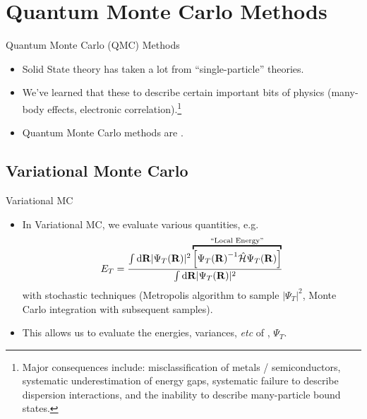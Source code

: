 \documentclass[12pt, pdf, hyperref={draft}, usenames, dvipsnames]{beamer}
\newcommand{\dd}{\mathrm{d}}
\newcommand{\red}[1]{{\bf\color{LancsRed}{#1}}}
\newcommand{\blue}[1]{{\bf\color{NavyBlue}{#1}}}
\newcommand{\green}[1]{{\bf\color{ForestGreen}{#1}}}
\begin{document}


\section{Quantum Monte Carlo Methods}

\begin{frame}{Quantum Monte Carlo (QMC) Methods}
\begin{itemize}
\item Solid State theory has taken a lot from ``single-particle''
theories.

\item We've learned that these \red{fail} to describe certain important bits
of physics (many-body effects, electronic correlation).\footnote{Major
consequences include: misclassification of metals / semiconductors, systematic
underestimation of energy gaps, systematic failure to describe dispersion
interactions, and the inability to describe many-particle bound states.}

\item Quantum Monte Carlo methods are \blue{strikingly different}.
\end{itemize}
\end{frame}

\subsection{Variational Monte Carlo}

\begin{frame}{Variational MC}
\begin{itemize}
  \item In Variational MC, we evaluate various quantities, e.g.
  \begin{equation}
    E_T = \dfrac{\int\dd{\bf R} \lvert \Psi_T({\bf R})\rvert^2
    \overbracket{\left[{\Psi_T({\bf R})}^{-1} \mathcal{\hat H} \Psi_T({\bf R})
    \right]}^{\text{``Local Energy''}}}
    {\int\dd{\bf R} \lvert \Psi_T({\bf R})\rvert^2}
  \end{equation}
  with stochastic techniques (Metropolis algorithm to sample $\lvert \Psi_T
  \rvert^2$, Monte Carlo integration with subsequent samples).

  \item This allows us to evaluate the energies, variances, \textit{etc} of
  \green{trial wavefunctions}, $\Psi_T$.
\end{itemize}
\end{frame}
\end{document}
